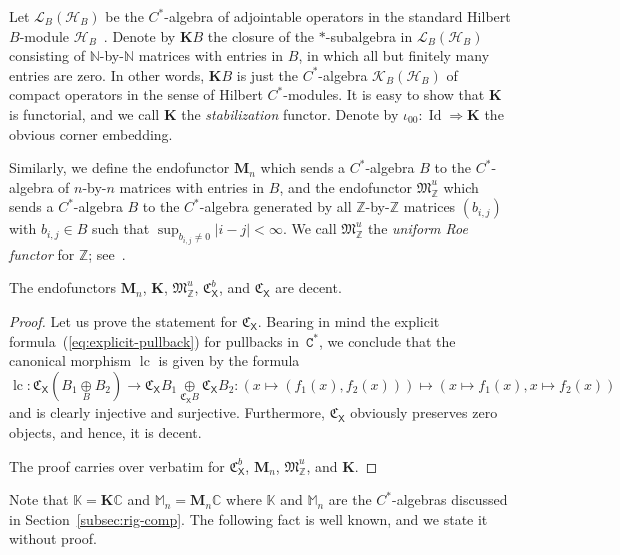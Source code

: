 \documentclass[10pt]{simplearticle}
\newcommand{\Id}{\operatorname{Id}}
\newcommand{\Cstar}{\mathtt{C^{*}}}
\newcommand{\C}{\mathfrak{C}^{\,}}
\newcommand{\lc}{\operatorname{lc}}
\newcommand{\oK}{\mathbb{K}}
\newcommand{\fK}{\mathbf{K}}
\newcommand{\fM}{\mathbf{M}}
\newcommand{\oM}{\mathbb{M}}
\begin{document}
\begin{defn}\label{def:bbK}
Let $\mathcal{L}_{B}(\mathcal{H}_{B})$ be the $C^{*}$-algebra
of adjointable operators in the standard Hilbert $B$-module $\mathcal{H}_{B}$~\cite{lance1995}.
Denote by $\fK B$ the closure of the $*$-subalgebra in $\mathcal{L}_{B}(\mathcal{H}_{B})$
consisting of $\mathbb{N}$-by-$\mathbb{N}$ matrices with entries
in $B$, in which all but finitely many entries are zero. In other
words, $\fK B$ is just the $C^{*}$-algebra $\mathcal{K}_{B}(\mathcal{H}_{B})$
of compact operators in the sense of Hilbert $C^{*}$-modules. It
is easy to show that $\fK$ is functorial, and we call $\fK$ the
\emph{stabilization} functor. Denote by $\iota_{00}\colon\Id\Rightarrow\fK$
the obvious corner embedding.

Similarly, we define the endofunctor $\fM_{n}$ which sends a $C^{*}$-algebra
$B$ to the $C^{*}$-algebra of $n$-by-$n$ matrices with entries
in $B$, and the endofunctor $\mathfrak{M}^{u}_{\mathbb{Z}}$ which
sends a $C^{*}$-algebra $B$ to the $C^{*}$-algebra generated by
all $\mathbb{Z}$-by-$\mathbb{Z}$ matrices $(b_{i,j})$ with $b_{i,j}\in B$
such that $\sup_{b_{i,j}\neq0}|i-j|<\infty$. We call $\mathfrak{M}^{u}_{\mathbb{Z}}$
the \emph{uniform Roe functor} for $\mathbb{Z}$; see~\cite{makeev_asadj}.
\end{defn}

\begin{lem}\label{lem:decent-ex}
The endofunctors $\fM_{n}$, $\fK$, $\mathfrak{M}^{u}_{\mathbb{Z}}$,
$\mathfrak{C}^{b}_{\mathsf{X}}$, and $\C_{\mathsf{X}}$ are decent.
\end{lem}

\begin{proof}
Let us prove the statement for $\C_{\mathsf{X}}$.
Bearing in mind the explicit formula~(\ref{eq:explicit-pullback})
for pullbacks in~$\Cstar$, we conclude that the canonical morphism
$\lc$ is given by the formula
\[
\lc\colon\C_{\mathsf{X}}(B_{1}\underset{B}{\oplus}B_{2})\to\C_{\mathsf{X}}B_{1}\underset{\C_{\mathsf{X}}B}{\oplus}\C_{\mathsf{X}}B_{2}:(x\mapsto(f_{1}(x),f_{2}(x)))\mapsto(x\mapsto f_{1}(x),x\mapsto f_{2}(x))
\]
and is clearly injective and surjective. Furthermore, $\C_{\mathsf{X}}$
obviously preserves zero objects, and hence, it is decent.

The proof carries over verbatim for $\mathfrak{C}^{b}_{\mathsf{X}}$,
$\fM_{n}$, $\mathfrak{M}^{u}_{\mathbb{Z}}$, and $\fK$.
\end{proof}

Note that $\oK=\fK\mathbb{C}$ and $\oM_{n}=\fM_{n}\mathbb{C}$ where
$\oK$ and $\oM_{n}$ are the $C^{*}$-algebras discussed in Section~\ref{subsec:rig-comp}.
The following fact is well known, and we state it without proof.
\end{document}
